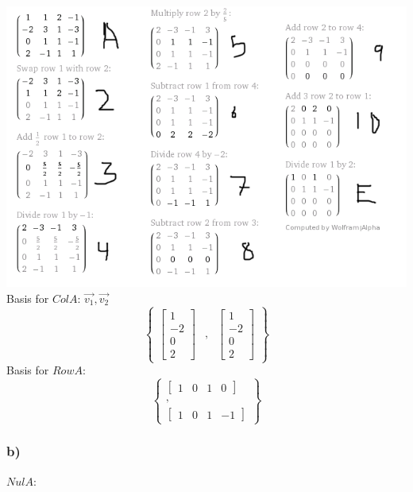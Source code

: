 \documentclass[12pt,norsk,a4paper]{article}
\begin{document}
\includegraphics[scale=0.4]{row-reduce.png}\\
Basis for $Col A$: {$\vec{v_1}, \vec{v_2}$}\\
\begin{equation*}
\begin{Bmatrix}
\begin{bmatrix}
1\\
-2\\
0\\
2
\end{bmatrix} & , &
\begin{bmatrix}
1\\
-2\\
0\\
2
\end{bmatrix}
\end{Bmatrix}
\end{equation*}
Basis for $Row A$:
\begin{equation*}
\begin{Bmatrix}
\begin{bmatrix}
1 & 0 & 1 & 0
\end{bmatrix}\\
,\\
\begin{bmatrix}
1 & 0 & 1 & -1
\end{bmatrix}
\end{Bmatrix}
\end{equation*}
\clearpage
\subsubsection{b)} %
\label{ssub:b_}
$Nul A$:
\end{document}
